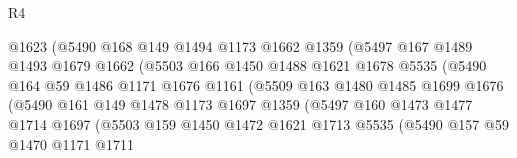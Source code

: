 \begin{lexlean}{R4}
\begin{coremodule}
                            @1623
                            (@5490
                              @168
                              @149
                              @1494
                              @1173
                              @1662
                              @1359
                              (@5497
                                @167
                                @1489
                                @1493
                                @1679
                                @1662
                                (@5503
                                  @166
                                  @1450
                                  @1488
                                  @1621
                                  @1678
                                  @5535
                                  (@5490
                                    @164
                                    @59
                                    @1486
                                    @1171
                                    @1676
                                    @1161
                                    (@5509
                                      @163
                                      @1480
                                      @1485
                                      @1699
                                      @1676
                                      (@5490
                                        @161
                                        @149
                                        @1478
                                        @1173
                                        @1697
                                        @1359
                                        (@5497
                                          @160
                                          @1473
                                          @1477
                                          @1714
                                          @1697
                                          (@5503
                                            @159
                                            @1450
                                            @1472
                                            @1621
                                            @1713
                                            @5535
                                            (@5490
                                              @157
                                              @59
                                              @1470
                                              @1171
                                              @1711

\end{coremodule}
\end{lexlean}
